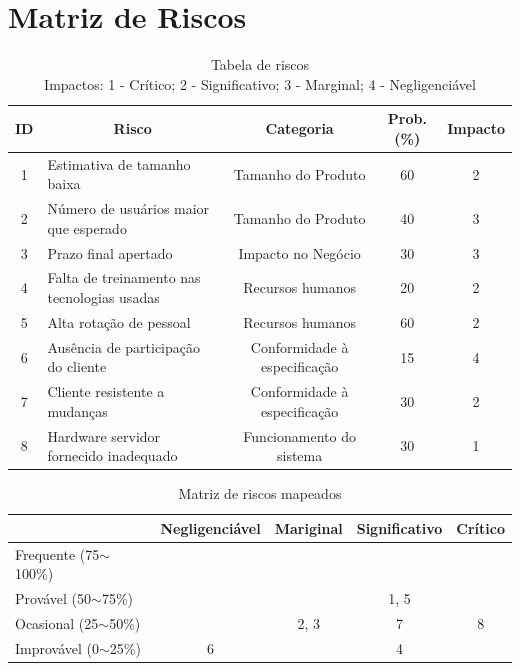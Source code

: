 \documentclass[a4paper,11pt]{article}
\begin{document}
\section{Matriz de Riscos}
	\begin{table}[H]
		\begin{tabular}{c|l|c|c|c}
			\textbf{ID} & \multicolumn{1}{c|}{\textbf{Risco}} & \textbf{Categoria} & \textbf{Prob.(\%)} & \textbf{Impacto} \\
			\hline
			1 & Estimativa de tamanho baixa 				& Tamanho do Produto			& 60 & 2 \\
			2 & Número de usuários maior que esperado 		& Tamanho do Produto			& 40 & 3 \\
			3 & Prazo final apertado 						& Impacto no Negócio			& 30 & 3 \\
			4 & Falta de treinamento nas tecnologias usadas	& Recursos humanos				& 20 & 2 \\
			5 & Alta rotação de pessoal 					& Recursos humanos				& 60 & 2 \\
			6 & Ausência de participação do cliente			& Conformidade à especificação	& 15 & 4 \\
			7 & Cliente resistente a mudanças 				& Conformidade à especificação	& 30 & 2 \\
			8 & Hardware servidor fornecido inadequado		& Funcionamento do sistema		& 30 & 1 \\
		\end{tabular}
		\caption{Tabela de riscos\\Impactos: 1 - Crítico; 2 - Significativo; 3 - Marginal; 4 - Negligenciável}
	\end{table}
	
	\begin{table}[H]
		\begin{tabular}{l|c|c|c|c|}
										& Negligenciável		& Mariginal				& Significativo			& Crítico \\ \hline
			Frequente (75$\sim$100\%) 	& \cellcolor{yellow}	& \cellcolor{red}		& \cellcolor{red}		& \cellcolor{red} \\ \hline
			Provável (50$\sim$75\%)		&						& \cellcolor{yellow}	& \cellcolor{red} 1, 5	& \cellcolor{red} \\ \hline
			Ocasional (25$\sim$50\%)	&  						& 2, 3					& \cellcolor{yellow} 7	& \cellcolor{red} 8 \\ \hline
			Improvável (0$\sim$25\%)	& 6						&						& 4						& \cellcolor{yellow} \\ \hline
		\end{tabular}
		\caption{Matriz de riscos mapeados}
	\end{table}
\end{document}

